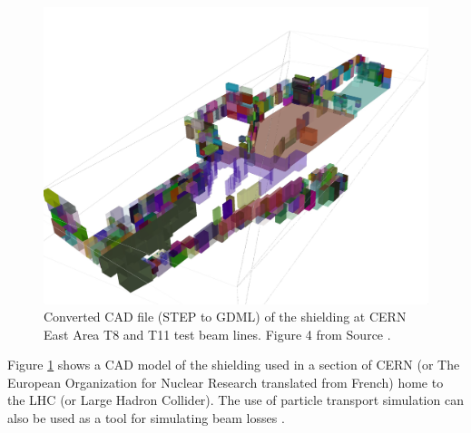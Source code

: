 \documentclass[12pt,a4paper]{article}
\begin{document}
\begin{figure}[h!]
\centering
\includegraphics[scale=0.13]{Images//introduction//CernEast.jpg}
\caption[width=\columnwidth]{Converted CAD file (STEP to GDML) of the shielding at CERN East Area T8 and T11 test beam lines. Figure 4 from Source \cite{pyg4om}.}
\label{cerncad}
\end{figure}

\newpage
\noindent Figure \ref{cerncad} shows a CAD model of the shielding used in a section of CERN (or The European Organization for Nuclear Research translated from French) home to the LHC (or Large Hadron Collider). The use of particle transport simulation can also be used as a tool for simulating beam losses \cite{pyg4om}.
\end{document}
